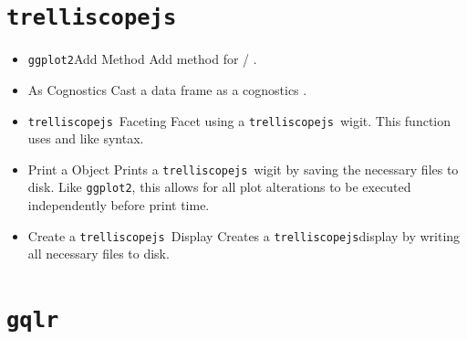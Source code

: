 \documentclass[stat,dissertation]{puthesis}\usepackage[]{graphicx}\usepackage{xcolor}
\newcommand{\pkg}[1]{\texttt{#1}}
\newcommand{\ggplot}{\pkg{ggplot2}}
\newcommand{\trelliscopejs}{\pkg{trelliscopejs}}
\newcommand{\gqlr}{\pkg{gqlr}}
\newcommand{\tick}{\item[-]}
\begin{document}
\section{\trelliscopejs}

\begin{itemize}
  \tick {} \ggplot Add Method \newline Add method for  / .
  \tick {} As Cognostics \newline Cast a data frame as a cognostics .
  \tick {} \trelliscopejs~Faceting \newline Facet using a \trelliscopejs~wigit.  This function uses  and  like syntax.
  \tick {} Print a  Object \newline Prints a \trelliscopejs~wigit by saving the necessary files to disk.  Like \ggplot, this allows for all plot alterations to be executed independently before print time.
  \tick {} Create a \trelliscopejs~Display \newline Creates a \trelliscopejs display by writing all necessary files to disk.
\end{itemize}



\section{\gqlr}
\end{document}
